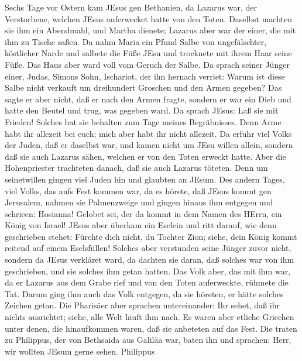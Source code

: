  Sechs Tage vor Ostern kam JEsus gen Bethanien, da Lazarus
war, der Verstorbene, welchen JEsus auferwecket hatte von den Toten.
 Daselbst machten sie ihm ein Abendmahl, und Martha dienete;
Lazarus aber war der einer, die mit ihm zu Tische saßen.  Da
nahm Maria ein Pfund Salbe von ungefälschter, köstlicher Narde und
salbete die Füße JEsu und trocknete mit ihrem Haar seine Füße. Das Haus
aber ward voll vom Geruch der Salbe.  Da sprach seiner
Jünger einer, Judas, Simons Sohn, Ischariot, der ihn hernach verriet:
 Warum ist diese Salbe nicht verkauft um dreihundert
Groschen und den Armen gegeben?  Das sagte er aber nicht,
daß er nach den Armen fragte, sondern er war ein Dieb und hatte den
Beutel und trug, was gegeben ward.  Da sprach JEsus: Laß sie
mit Frieden! Solches hat sie behalten zum Tage meines Begräbnisses.
 Denn Arme habt ihr allezeit bei euch; mich aber habt ihr
nicht allezeit.  Da erfuhr viel Volks der Juden, daß er
daselbst war, und kamen nicht um JEsu willen allein, sondern daß sie
auch Lazarus sähen, welchen er von den Toten erweckt hatte.
 Aber die Hohenpriester trachteten danach, daß sie auch
Lazarus töteten.  Denn um seinetwillen gingen viel Juden
hin und glaubten an JEsum.  Des andern Tages, viel Volks,
das aufs Fest kommen war, da es hörete, daß JEsus kommt gen Jerusalem,
 nahmen sie Palmenzweige und gingen hinaus ihm entgegen und
schrieen: Hosianna! Gelobet sei, der da kommt in dem Namen des HErrn,
ein König von Israel!  JEsus aber überkam ein Eselein und
ritt darauf, wie denn geschrieben stehet:  Fürchte dich
nicht, du Tochter Zion; siehe, dein König kommt reitend auf einem
Eselsfüllen!  Solches aber verstunden seine Jünger zuvor
nicht, sondern da JEsus verkläret ward, da dachten sie daran, daß
solches war von ihm geschrieben, und sie solches ihm getan hatten.
 Das Volk aber, das mit ihm war, da er Lazarus aus dem
Grabe rief und von den Toten auferweckte, rühmete die Tat. 
Darum ging ihm auch das Volk entgegen, da sie höreten, er hätte solches
Zeichen getan.  Die Pharisäer aber sprachen untereinander:
Ihr sehet, daß ihr nichts ausrichtet; siehe, alle Welt läuft ihm nach.
 Es waren aber etliche Griechen unter denen, die
hinaufkommen waren, daß sie anbeteten auf das Fest.  Die
traten zu Philippus, der von Bethsaida aus Galiläa war, baten ihn und
sprachen: Herr, wir wollten JEsum gerne sehen.  Philippus
